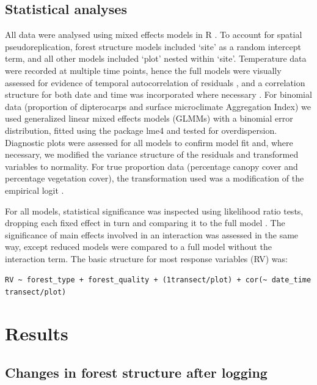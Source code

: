 \documentclass[12pt,a4paper,]{report}
\theoremstyle{definition}
\theoremstyle{definition}
\theoremstyle{definition}
\theoremstyle{remark}
\begin{document}
\subsection{Statistical analyses}\label{statistical-analyses}

All data were analysed using mixed effects models in R \citep[version
3.3.0;][]{r_core_team_r:2017}. To account for spatial pseudoreplication,
forest structure models included `site' as a random intercept term, and
all other models included `plot' nested within `site'. Temperature data
were recorded at multiple time points, hence the full models were
visually assessed for evidence of temporal autocorrelation of residuals
\citep[function `acf' in the nlme package;][]{pinheiro_nlme:2017}, and a
correlation structure for both date and time was incorporated where
necessary \citep[the specific structure was chosen using
AIC;][]{zuur_mixed2009}. For binomial data (proportion of dipterocarps
and surface microclimate Aggregation Index) we used generalized linear
mixed effects models (GLMMs) with a binomial error distribution, fitted
using the package lme4 \citep{bates_fitting2015} and tested for
overdispersion. Diagnostic plots were assessed for all models to confirm
model fit and, where necessary, we modified the variance structure of
the residuals \citep{zuur_mixed2009} and transformed variables to
normality. For true proportion data (percentage canopy cover and
percentage vegetation cover), the transformation used was a modification
of the empirical logit \citep{warton_arcsine2011}.

For all models, statistical significance was inspected using likelihood
ratio tests, dropping each fixed effect in turn and comparing it to the
full model \citep{zuur_mixed2009}. The significance of main effects
involved in an interaction was assessed in the same way, except reduced
models were compared to a full model without the interaction term. The
basic structure for most response variables (RV) was:

\texttt{RV\ \textasciitilde{}\ forest\_type\ +\ forest\_quality\ +\ (1\textbar{}transect/plot)\ +\ cor(\textasciitilde{}\ date\_time\textbar{}transect/plot)}

\section{Results}\label{results-1}

\subsection{Changes in forest structure after
logging}\label{changes-in-forest-structure-after-logging}
\end{document}
